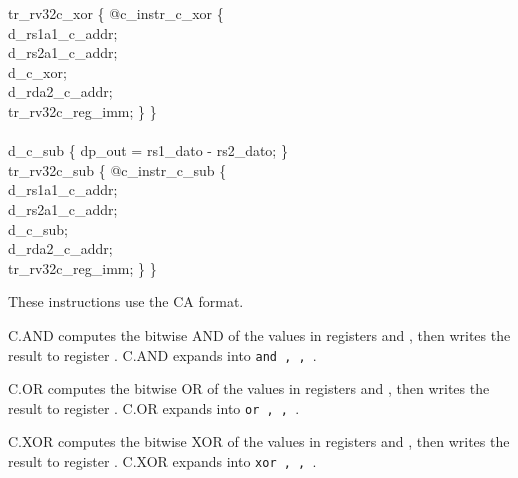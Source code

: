 {\indent tr\_rv32c\_xor \{ @c\_instr\_c\_xor \{ \\%
\indent \hspace{\parindent} d\_rs1a1\_c\_addr; \\%
\indent \hspace{\parindent} d\_rs2a1\_c\_addr; \\%
\indent \hspace{\parindent} d\_c\_xor; \\%
\indent \hspace{\parindent} d\_rda2\_c\_addr;\\%
\indent \hspace{\parindent} tr\_rv32c\_reg\_imm; \} \} \\%
\\
\indent d\_c\_sub \{ dp\_out = rs1\_dato - rs2\_dato; \}\\%
\indent tr\_rv32c\_sub \{ @c\_instr\_c\_sub \{ \\%
\indent \hspace{\parindent} d\_rs1a1\_c\_addr; \\%
\indent \hspace{\parindent} d\_rs2a1\_c\_addr; \\%
\indent \hspace{\parindent} d\_c\_sub; \\%
\indent \hspace{\parindent} d\_rda2\_c\_addr; \\%
\indent \hspace{\parindent} tr\_rv32c\_reg\_imm; \} \} \\%
}

These instructions use the CA format.

C.AND computes the bitwise AND of the values in registers {\em \rdprime}
and {\em \rstwoprime}, then writes the result to register {\em \rdprime}.
C.AND expands into {\tt and \rdprime, \rdprime, \rstwoprime}.

C.OR computes the bitwise OR of the values in registers {\em \rdprime}
and {\em \rstwoprime}, then writes the result to register {\em \rdprime}.
C.OR expands into {\tt or \rdprime, \rdprime, \rstwoprime}.

C.XOR computes the bitwise XOR of the values in registers {\em \rdprime}
and {\em \rstwoprime}, then writes the result to register {\em \rdprime}.
C.XOR expands into {\tt xor \rdprime, \rdprime, \rstwoprime}.

